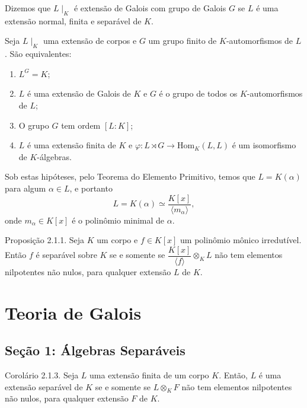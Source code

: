 \documentclass{beamer}
\begin{document}
\begin{frame}
    Dizemos que $L\mid_K$ é extensão de Galois com grupo de Galois $G$ se $L$ é uma extensão normal, finita e separável de $K$.
    
    \vspace{18pt}
    Seja $L\mid_K$ uma extensão de corpos e $G$ um grupo finito de $K$-automorfismos de $L$. São equivalentes:
    \begin{enumerate}
    \item $L^G = K$;
    \item $L$ é uma extensão de Galois de $K$ e $G$ é o grupo de todos os $K$-automorfismos de $L$;
    \item O grupo $G$ tem ordem $[L:K]$;
    \item $L$ é uma extensão finita de $K$ e $\varphi: L\rtimes G \rightarrow \text{Hom}_{K}(L,L)$ é um isomorfismo de $K$-álgebras.
    \end{enumerate}
\end{frame}
\begin{frame}
    Sob estas hipóteses, pelo Teorema do Elemento Primitivo, temos que $L = K(\alpha)$ para algum $\alpha \in L$, e portanto \[L = K(\alpha) \simeq \dfrac{K[x]}{\langle m_\alpha \rangle},\] onde $m_\alpha \in K[x]$ é o polinômio minimal de $\alpha$.
\end{frame}

\begin{frame}{Proposição 2.1.1.}
    Seja $K$ um corpo e $f \in K[x]$ um polinômio mônico irredutível. Então $f$ é separável sobre $K$ se e somente se $\dfrac{K[x]}{\langle f \rangle} \otimes_K L$ não tem elementos nilpotentes não nulos, para qualquer extensão $L$ de $K$.
\end{frame}

            \section{Teoria de Galois}
            \subsection{Seção 1: Álgebras Separáveis}

\begin{frame}{Corolário 2.1.3.}
    Seja $L$ uma extensão finita de um corpo $K$. Então, $L$ é uma extensão separável de $K$ se e somente se $L\otimes_K F$ não tem elementos nilpotentes não nulos, para qualquer extensão $F$ de $K$.
\end{frame}
\end{document}
